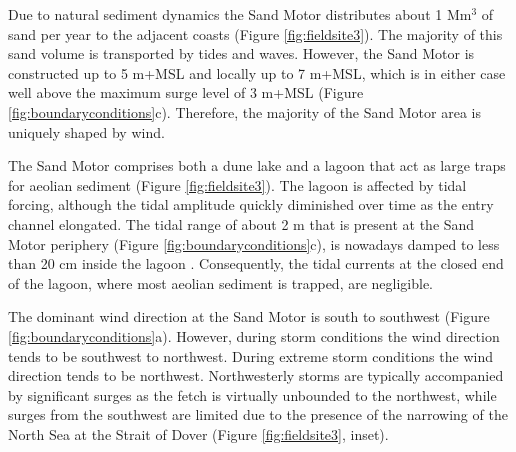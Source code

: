 Due to natural sediment dynamics the Sand Motor distributes about 1
$\mathrm{Mm^3}$ of sand per year to the adjacent coasts (Figure
\ref{fig:fieldsite3}). The majority of this sand volume is transported
by tides and waves. However, the Sand Motor is constructed up to 5
m+MSL and locally up to 7 m+MSL, which is in either case well above
the maximum surge level of 3 m+MSL (Figure
\ref{fig:boundaryconditions}c). Therefore, the majority of the Sand
Motor area is uniquely shaped by wind.

The Sand Motor comprises both a dune lake and a lagoon that act as
large traps for aeolian sediment (Figure \ref{fig:fieldsite3}). The
lagoon is affected by tidal forcing, although the tidal amplitude
quickly diminished over time as the entry channel elongated. The tidal
range of about 2 m that is present at the Sand Motor periphery (Figure
\ref{fig:boundaryconditions}c), is nowadays damped to less than 20 cm
inside the lagoon \citep{deVries2015}. Consequently, the tidal
currents at the closed end of the lagoon, where most aeolian sediment
is trapped, are negligible.

The dominant wind direction at the Sand Motor is south to southwest
(Figure \ref{fig:boundaryconditions}a). However, during storm
conditions the wind direction tends to be southwest to
northwest. During extreme storm conditions the wind direction tends to
be northwest. Northwesterly storms are typically accompanied by
significant surges as the fetch is virtually unbounded to the
northwest, while surges from the southwest are limited due to the
presence of the narrowing of the North Sea at the Strait of Dover
(Figure \ref{fig:fieldsite3}, inset).

